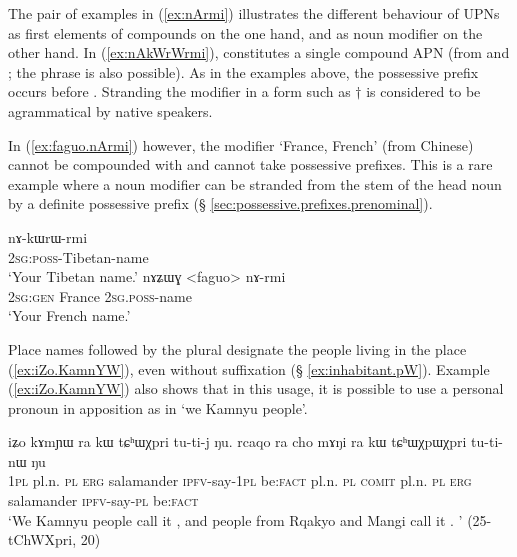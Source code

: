 The pair of examples in (\ref{ex:nArmi}) illustrates the different behaviour of UPNs as first elements of compounds on the one hand, and as noun modifier on the other hand. In (\ref{ex:nAkWrWrmi}),   constitutes a single compound APN (from  and ; the phrase  is also possible).  As in the examples above, the possessive prefix occurs before . Stranding the modifier in a form such as $\dagger$ is considered to be agrammatical by native speakers.
 
In (\ref{ex:faguo.nArmi}) however, the modifier  `France, French' (from Chinese) cannot be compounded with   and cannot take possessive prefixes. This is a rare example where a noun modifier can be stranded from the stem of the head noun by a definite possessive prefix (§ \ref{sec:possessive.prefixes.prenominal}).

\begin{exe}
\ex \label{ex:nArmi}
\begin{xlist}
\ex  \label{ex:nAkWrWrmi}
\gll nɤ-kɯrɯ-rmi   \\
\textsc{2sg}:\textsc{poss}-Tibetan-name \\
\glt `Your Tibetan name.' 
\ex  \label{ex:faguo.nArmi}
\gll nɤʑɯɣ <faguo> nɤ-rmi   \\
\textsc{2sg}:\textsc{gen} France \textsc{2sg}.\textsc{poss}-name \\
\glt `Your French name.' 
\end{xlist}
\end{exe}
 
Place names followed by the plural  designate the people living in the place (\ref{ex:iZo.KamnYW}), even without  suffixation (§ \ref{ex:inhabitant.pW}). Example (\ref{ex:iZo.KamnYW}) also shows that in this usage, it is possible to use a personal pronoun in apposition as in   `we Kamnyu people'.

\begin{exe}
\ex \label{ex:iZo.KamnYW}
 \gll iʑo kɤmɲɯ ra kɯ tɕʰɯχpri tu-ti-j ŋu. rcaqo ra cho mɤŋi ra kɯ tɕʰɯχpɯχpri tu-ti-nɯ ŋu \\
 \textsc{1pl} pl.n. \textsc{pl} \textsc{erg} salamander \textsc{ipfv}-say-\textsc{1pl} be:\textsc{fact} pl.n. \textsc{pl} \textsc{comit} pl.n. \textsc{pl} \textsc{erg}  salamander \textsc{ipfv}-say-\textsc{pl} be:\textsc{fact} \\
 \glt `We Kamnyu people call it , and people from Rqakyo and Mangi call it . ' (25-tChWXpri, 20)
\end{exe}

